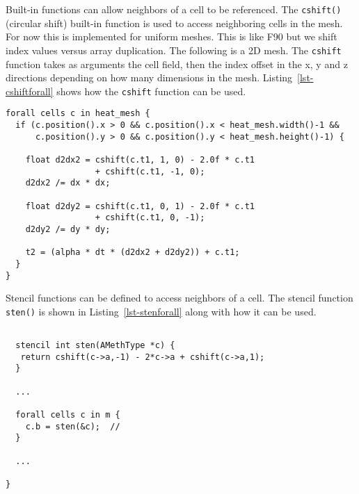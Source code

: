 

Built-in functions can allow neighbors of a cell to be referenced.  The \texttt{cshift()} 
(circular shift) built-in function is used to access neighboring cells in the mesh.
For now this is implemented for uniform meshes.  This is like F90 but we shift index values 
versus array duplication.  The following is a 2D mesh.  The \texttt{cshift}  function
takes as arguments the cell field, then the index offset in the x, y and z directions depending
on how many dimensions in the mesh.  Listing~\ref{lst-cshiftforall} shows how the \texttt{cshift}
function can be used.

\par\bigskip
\begin{lstlisting}[float=h,label=lst-cshiftforall,
	caption={\texttt{forall} loop construct with use of cshift.}]
forall cells c in heat_mesh {
  if (c.position().x > 0 && c.position().x < heat_mesh.width()-1 &&
      c.position().y > 0 && c.position().y < heat_mesh.height()-1) {

    float d2dx2 = cshift(c.t1, 1, 0) - 2.0f * c.t1 
                  + cshift(c.t1, -1, 0);
    d2dx2 /= dx * dx;

    float d2dy2 = cshift(c.t1, 0, 1) - 2.0f * c.t1 
                  + cshift(c.t1, 0, -1);
    d2dy2 /= dy * dy;

    t2 = (alpha * dt * (d2dx2 + d2dy2)) + c.t1;
  }
}
\end{lstlisting}
\par\bigskip\noindent

Stencil functions can be defined to access neighbors of a cell.  The stencil function \texttt{sten()} is shown in Listing~\ref{lst-stenforall} along with how it can be used.

\par\bigskip
\begin{lstlisting}[float=h,label=lst-stenforall,
	caption={Nested \texttt{forall} loop construct with stencil.}]

  stencil int sten(AMethType *c) {
   return cshift(c->a,-1) - 2*c->a + cshift(c->a,1);
  }

  ...

  forall cells c in m {
    c.b = sten(&c);  // 
  }
  
  ...
	
}
\end{lstlisting}
\par\bigskip\noindent

